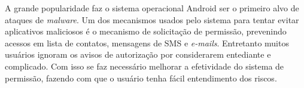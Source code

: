 A grande popularidade faz o sistema operacional Android ser o primeiro alvo de ataques de \textit{malware}. Um dos mecanismos usados pelo sistema para tentar evitar aplicativos maliciosos é o mecanismo de solicitação de permissão, prevenindo acessos em lista de contatos, mensagens de SMS e \textit{e-mails}. Entretanto muitos usuários ignoram os avisos de autorização por considerarem entediante e complicado. Com isso se faz necessário melhorar a efetividade do sistema de permissão, fazendo com que o usuário tenha fácil entendimento dos riscos. \cite{wang2017android}


